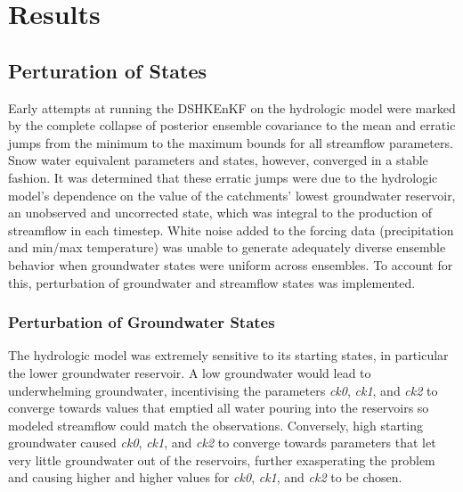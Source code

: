 \chapter{Results}

\section{Perturation of States}

Early attempts at running the DSHKEnKF on the hydrologic model were marked by the complete collapse of posterior ensemble covariance to the mean and erratic jumps from the minimum to the maximum bounds for all streamflow parameters. Snow water equivalent parameters and states, however, converged in a stable fashion. It was determined that these erratic jumps were due to the hydrologic model's dependence on the value of the catchments' lowest groundwater reservoir, an unobserved and uncorrected state, which was integral to the production of streamflow in each timestep. White noise added to the forcing data (precipitation and min/max temperature) was unable to generate adequately diverse ensemble behavior when groundwater states were uniform across ensembles. To account for this, perturbation of groundwater and streamflow states was implemented.

\subsection{Perturbation of Groundwater States}

The hydrologic model was extremely sensitive to its starting states, in particular the lower groundwater reservoir. A low groundwater would lead to underwhelming groundwater, incentivising the parameters \textit{ck0}, \textit{ck1}, and \textit{ck2} to converge towards values that emptied all water pouring into the reservoirs so modeled streamflow could match the observations. Conversely, high starting groundwater caused \textit{ck0}, \textit{ck1}, and \textit{ck2} to converge towards parameters that let very little groundwater out of the reservoirs, further exasperating the problem and causing higher and higher values for \textit{ck0}, \textit{ck1}, and \textit{ck2} to be chosen. 

